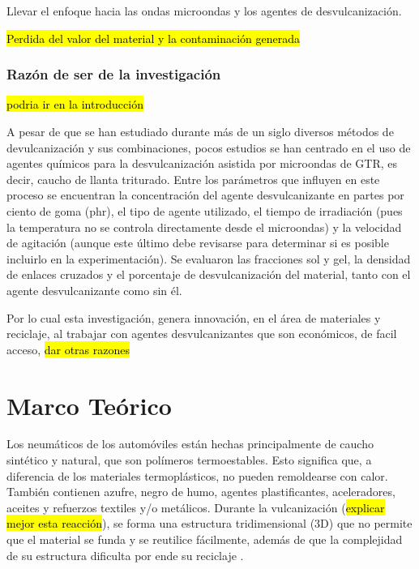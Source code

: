 Llevar el enfoque hacia las ondas microondas y los agentes de desvulcanización.

\hl{Perdida del valor del material y la contaminación generada}

\subsection{\textbf{\large{Razón de ser de la investigación}}}

\hl{podria ir en la introducción}

A pesar de que se han estudiado durante más de un siglo diversos métodos de devulcanización y sus combinaciones, pocos estudios se han centrado en el uso de agentes químicos para la desvulcanización asistida por microondas de GTR, es decir, caucho de llanta triturado. Entre los parámetros que influyen en este proceso se encuentran la concentración del agente desvulcanizante en partes por ciento de goma (phr), el tipo de agente utilizado, el tiempo de irradiación (pues la temperatura no se controla directamente desde el microondas) y la velocidad de agitación (aunque este último debe revisarse para determinar si es posible incluirlo en la experimentación). Se evaluaron las fracciones sol y gel, la densidad de enlaces cruzados y el porcentaje de desvulcanización del material, tanto con el agente desvulcanizante como sin él.

Por lo cual esta investigación, genera innovación, en el área de materiales y reciclaje, al trabajar con agentes desvulcanizantes que son económicos, de facil acceso, \hl{dar otras razones} 



\chapter{Marco Teórico}

Los neumáticos de los automóviles están hechas principalmente de caucho sintético y natural, que son polímeros termoestables. Esto significa que, a diferencia de los materiales termoplásticos, no pueden remoldearse con calor. También contienen azufre, negro de humo, agentes plastificantes, aceleradores, aceites y refuerzos textiles y/o metálicos. Durante la vulcanización (\hl{explicar mejor esta reacción}), se forma una estructura tridimensional (3D) que no permite que el material se funda y se reutilice fácilmente, además de que la complejidad de su estructura dificulta por ende su reciclaje \cite{Vahdatbin2022}.

